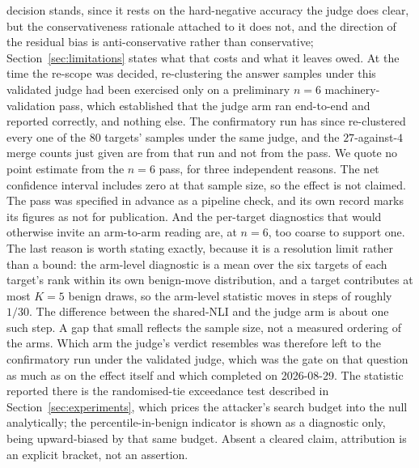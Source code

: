 decision stands, since it rests on the hard-negative accuracy the judge does clear, but the
conservativeness rationale attached to it does not, and the direction of the residual bias is
anti-conservative rather than conservative; Section~\ref{sec:limitations} states what that
costs and what it leaves owed. At the time the re-scope was decided, re-clustering
the answer samples under this validated judge had been exercised only on a
preliminary $n{=}6$ machinery-validation pass, which established that the judge arm ran
end-to-end and reported correctly, and nothing else. The confirmatory run has since
re-clustered every one of the $80$ targets' samples under the same judge, and the
$27$-against-$4$ merge counts just given are from that run and not from the pass. We quote no
point estimate from the $n{=}6$ pass, for three independent reasons. The net confidence interval includes zero at that sample size, so
the effect is not claimed. The pass was specified in advance as a pipeline check, and its
own record marks its figures as not for publication. And the per-target diagnostics that
would otherwise invite an arm-to-arm reading are, at $n{=}6$, too coarse to support one. The
last reason is worth stating exactly, because it is a resolution limit rather than a bound:
the arm-level diagnostic is a mean over the six targets of each target's rank within its own
benign-move distribution, and a target contributes at most $K{=}5$ benign draws, so the
arm-level statistic moves in steps of roughly $1/30$. The difference between the
shared-NLI and the judge arm is about one such step. A gap that small reflects the sample
size, not a measured ordering of the arms. Which arm the judge's verdict resembles was
therefore left to the
confirmatory run under the validated judge, which was the gate on that question as much
as on the effect itself and which completed on 2026-08-29. The statistic reported there is the
randomised-tie exceedance test
described in Section~\ref{sec:experiments}, which prices the attacker's search budget into
the null analytically; the percentile-in-benign indicator is shown as a diagnostic only,
being upward-biased by that same budget. Absent a cleared claim,
attribution is an explicit bracket, not an assertion.

